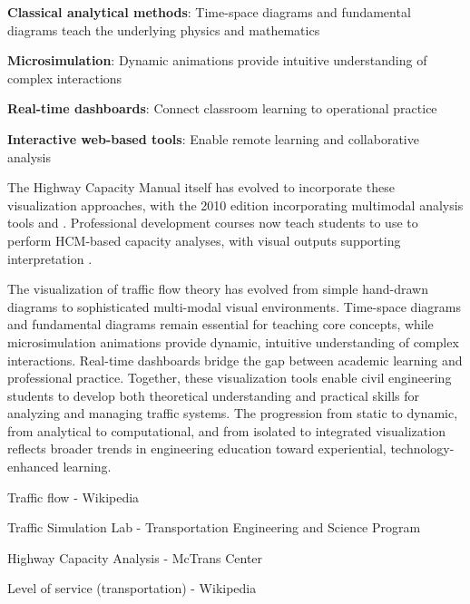 \begin{renum}
\item \textbf{Classical analytical methods}: Time-space diagrams and fundamental diagrams teach the underlying physics and mathematics
\item \textbf{Microsimulation}: Dynamic animations provide intuitive understanding of complex interactions
\item \textbf{Real-time dashboards}: Connect classroom learning to operational practice
\item \textbf{Interactive web-based tools}: Enable remote learning and collaborative analysis
\end{renum}
The Highway Capacity Manual itself has evolved to incorporate these visualization approaches, with the 2010 edition incorporating multimodal analysis tools and  . Professional development courses now teach students to use  to perform HCM-based capacity analyses, with visual outputs supporting interpretation .

The visualization of traffic flow theory has evolved from simple hand-drawn diagrams to sophisticated multi-modal visual environments. Time-space diagrams and fundamental diagrams remain essential for teaching core concepts, while microsimulation animations provide dynamic, intuitive understanding of complex interactions. Real-time dashboards bridge the gap between academic learning and professional practice. Together, these visualization tools enable civil engineering students to develop both theoretical understanding and practical skills for analyzing and managing traffic systems. The progression from static to dynamic, from analytical to computational, and from isolated to integrated visualization reflects broader trends in engineering education toward experiential, technology-enhanced learning.

 Traffic flow - Wikipedia

 Traffic Simulation Lab - Transportation Engineering and Science Program

 Highway Capacity Analysis - McTrans Center

 Level of service (transportation) - Wikipedia

